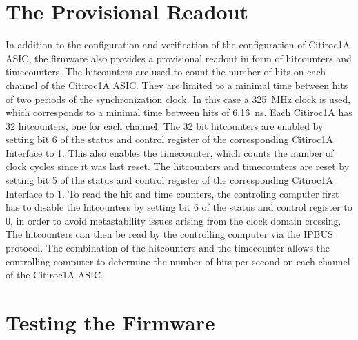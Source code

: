 \section{The Provisional Readout}
In addition to the configuration and verification of the configuration of Citiroc1A ASIC, the firmware also provides a provisional readout in form of hitcounters and timecounters. 
\newline
The hitcounters are used to count the number of hits on each channel of the Citiroc1A ASIC.
\newline
They are limited to a minimal time between hits of two periods of the synchronization clock.
In this case a \SI{325}{\mega\hertz} clock is used, which corresponds to a minimal time between hits of \SI{6.16}{\nano\second}.
\newline
Each Citiroc1A has 32 hitcounters, one for each channel.
The 32 bit hitcounters are enabled by setting bit 6 of the status and control register of the corresponding Citiroc1A Interface to 1. 
This also enables the timecounter, which counts the number of clock cycles since it was last reset. 
\newline
The hitcounters and timecounters are reset by setting bit 5 of the status and control register of the corresponding Citiroc1A Interface to 1.
\newline
To read the hit and time counters, the controling computer first has to disable the hitcounters by setting bit 6 of the status and control register to 0, in order to avoid metastability issues arising from the clock domain crossing.
The hitcounters can then be read by the controlling computer via the IPBUS protocol.
\newline
The combination of the hitcounters and the timecounter allows the controlling computer to determine the number of hits per second on each channel of the Citiroc1A ASIC. 


\section{Testing the Firmware}
